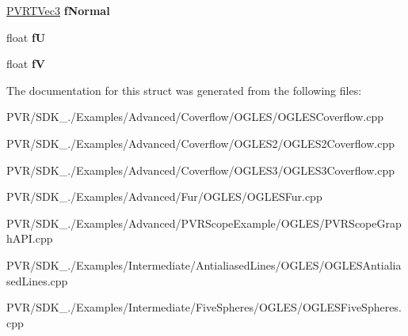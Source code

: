 \begin{DoxyCompactItemize}
\item 
\hypertarget{struct_s_vertex_a7c37400b78559a66f20d96b81a02e124}{\hyperlink{struct_p_v_r_t_vec3}{P\+V\+R\+T\+Vec3} {\bfseries f\+Normal}}\label{struct_s_vertex_a7c37400b78559a66f20d96b81a02e124}

\item 
\hypertarget{struct_s_vertex_a5b8bf59d98446302e1630ad244c97b1c}{float {\bfseries f\+U}}\label{struct_s_vertex_a5b8bf59d98446302e1630ad244c97b1c}

\item 
\hypertarget{struct_s_vertex_a7c1eca16bdef0d12947254ea0816fb1e}{float {\bfseries f\+V}}\label{struct_s_vertex_a7c1eca16bdef0d12947254ea0816fb1e}

\end{DoxyCompactItemize}


The documentation for this struct was generated from the following files\+:\begin{DoxyCompactItemize}
\item 
P\+V\+R/\+S\+D\+K\+\_./\+Examples/\+Advanced/\+Coverflow/\+O\+G\+L\+E\+S/O\+G\+L\+E\+S\+Coverflow.\+cpp\item 
P\+V\+R/\+S\+D\+K\+\_./\+Examples/\+Advanced/\+Coverflow/\+O\+G\+L\+E\+S2/O\+G\+L\+E\+S2\+Coverflow.\+cpp\item 
P\+V\+R/\+S\+D\+K\+\_./\+Examples/\+Advanced/\+Coverflow/\+O\+G\+L\+E\+S3/O\+G\+L\+E\+S3\+Coverflow.\+cpp\item 
P\+V\+R/\+S\+D\+K\+\_./\+Examples/\+Advanced/\+Fur/\+O\+G\+L\+E\+S/O\+G\+L\+E\+S\+Fur.\+cpp\item 
P\+V\+R/\+S\+D\+K\+\_./\+Examples/\+Advanced/\+P\+V\+R\+Scope\+Example/\+O\+G\+L\+E\+S/P\+V\+R\+Scope\+Graph\+A\+P\+I.\+cpp\item 
P\+V\+R/\+S\+D\+K\+\_./\+Examples/\+Intermediate/\+Antialiased\+Lines/\+O\+G\+L\+E\+S/O\+G\+L\+E\+S\+Antialiased\+Lines.\+cpp\item 
P\+V\+R/\+S\+D\+K\+\_./\+Examples/\+Intermediate/\+Five\+Spheres/\+O\+G\+L\+E\+S/O\+G\+L\+E\+S\+Five\+Spheres.\+cpp\end{DoxyCompactItemize}
